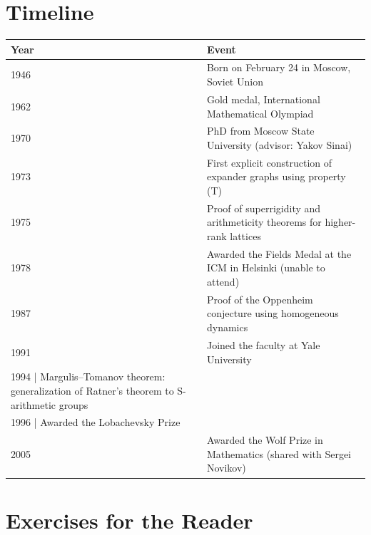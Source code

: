 \section*{Timeline}
\begin{tabularx}{\linewidth}{|p{1.5cm}|>{\raggedright\arraybackslash}X|}
\hline
\textbf{Year} & \textbf{Event} \\ \hline
1946 & Born on February 24 in Moscow, Soviet Union \\ \hline
1962 & Gold medal, International Mathematical Olympiad \\ \hline
1970 & PhD from Moscow State University (advisor: Yakov Sinai) \\ \hline
1973 & First explicit construction of expander graphs using property (T) \\ \hline
1975 & Proof of superrigidity and arithmeticity theorems for higher-rank lattices \\ \hline
1978 & Awarded the Fields Medal at the ICM in Helsinki (unable to attend) \\ \hline
1987 & Proof of the Oppenheim conjecture using homogeneous dynamics \\ \hline
1991 & Joined the faculty at Yale University \\ \hline
1994 | Margulis--Tomanov theorem: generalization of Ratner's theorem to S-arithmetic groups \\ \hline
1996 | Awarded the Lobachevsky Prize \\ \hline
2005 & Awarded the Wolf Prize in Mathematics (shared with Sergei Novikov) \\ \hline
\end{tabularx}

\section*{Exercises for the Reader}

